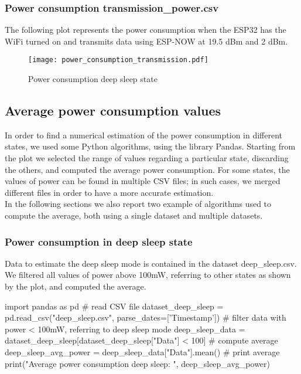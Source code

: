 \subsubsection{Power consumption transmission\_power.csv}
The following plot represents the power consumption when the ESP32 has the WiFi turned on and transmits data using ESP-NOW at 19.5 dBm and 2 dBm.
\begin{figure}[H]
    \centering
    \texttt{[image: power\_consumption\_transmission.pdf]}
    \caption{Power consumption deep sleep state}
    \label{fig:Power consumption deep sleep state}
\end{figure}

\subsection{Average power consumption values}
In order to find a numerical estimation of the power consumption in different states, we used some Python algorithms, using the library Pandas. Starting from the plot we selected the range of values regarding a particular state, discarding the others, and computed the average power consumption. For some states, the values of power can be found in multiple CSV files; in such cases, we merged different files in order to have a more accurate estimation.\\
In the following sections we also report two example of algorithms used to compute the average, both using a single dataset and multiple datasets.

\subsubsection{Power consumption in deep sleep state}
Data to estimate the deep sleep mode is contained in the dataset deep\_sleep.csv. We filtered all values of power above 100mW, referring to other states as shown by the plot, and computed the average.

\begin{python}
import pandas as pd 
# read CSV file 
dataset_deep_sleep = pd.read_csv("deep_sleep.csv", parse_dates=['Timestamp'])
# filter data with power < 100mW, referring to deep sleep mode
deep_sleep_data = dataset_deep_sleep[dataset_deep_sleep["Data"] < 100]
# compute average
deep_sleep_avg_power = deep_sleep_data["Data"].mean()
# print average 
print("Average power consumption deep sleep: ", deep_sleep_avg_power)
\end{python}

